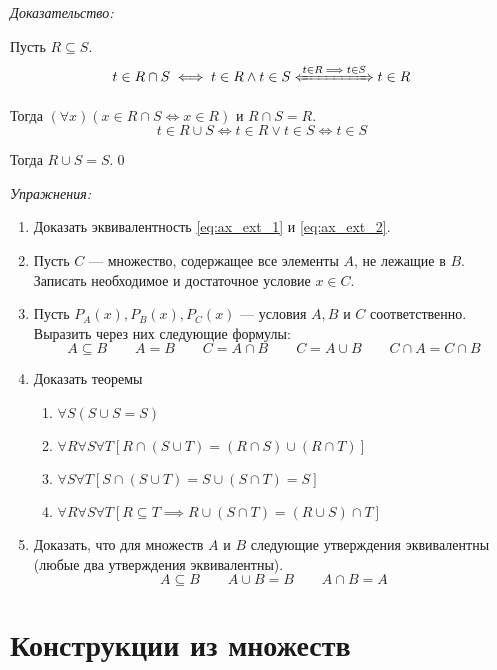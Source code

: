 {\it Доказательство:}

Пусть $R\subseteq S$.
\[
	t\in R\cap S\iff t\in R\land t\in S\xLeftrightarrow{t\in R\implies t\in S} t\in R
\]

Тогда $(\forall x)(x\in R\cap S\iff x\in R)$ и $R\cap S=R$.
\[
	t\in R\cup S\iff t\in R\lor t\in S\iff t\in S
\]

Тогда $R\cup S=S$.\qed

\newcommand\eset{\varnothing}
\vspace{1em}
{\it Упражнения:}
\begin{enumerate}
	\item{}Доказать эквивалентность \eqref{eq:ax_ext_1} и \eqref{eq:ax_ext_2}.

	\item{}Пусть $C$ --- множество, содержащее все элементы $A$, не лежащие в $B$.
	Записать необходимое и достаточное условие $x\in C$.

	\item{}Пусть $P_{A}(x), P_{B}(x),P_{C}(x)$ --- условия $A,B$ и $C$ соответственно.
	Выразить через них следующие формулы:
	\[
		A\subseteq B\qquad A=B\qquad
		C=A\cap B\qquad C=A\cup B\qquad
		C\cap A=C\cap B
	\]

	\item{}Доказать теоремы
	\begin{fullwidth}
		\begin{multicols}{2}
			\begin{enumerate}
				\item{}$\forall S(S\cup S=S)$
				\item{}$\forall R\forall S\forall T[R\cap (S\cup T)=(R\cap S)\cup (R\cap T)]$
				\item{}$\forall S\forall T[S\cap (S\cup T)=S\cup (S\cap T)=S]$
				\item{}$\forall R\forall S\forall T[R\subseteq T
							\implies R\cup (S\cap T)=(R\cup S)\cap T]$
			\end{enumerate}
		\end{multicols}
	\end{fullwidth}


	\item{}Доказать, что для множеств $A$ и $B$ следующие утверждения эквивалентны
	(любые два утверждения эквивалентны).
	\[
		A\subseteq B\qquad A\cup B=B\qquad A\cap B=A
	\]
\end{enumerate}

\section{Конструкции из множеств}

